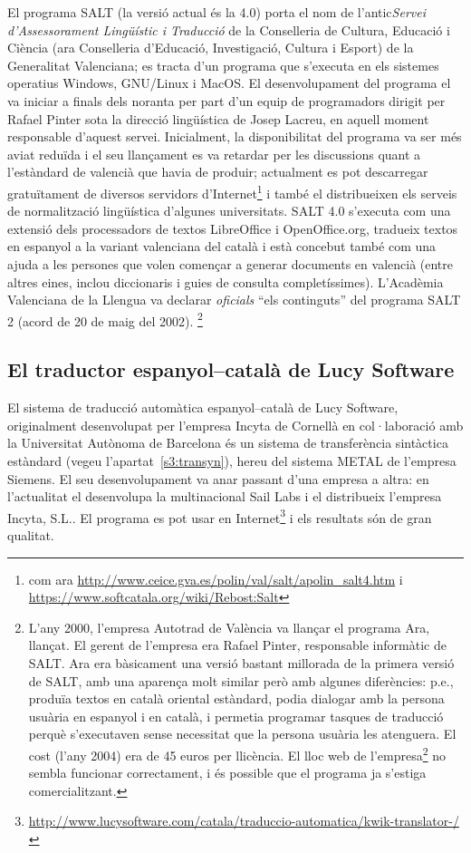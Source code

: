 El programa SALT (la versió actual és la 4.0) porta el nom de
l'antic\emph{Servei d'Assessorament Lingüístic i Traducció} de la
Conselleria de Cultura, Educació i Ciència (ara Conselleria
d'Educació, Investigació, Cultura i Esport) de la Generalitat
Valenciana; es tracta d'un programa que s'executa en els sistemes
operatius Windows, GNU/Linux i MacOS. El desenvolupament del programa
el va iniciar a finals dels noranta per part d'un equip de
programadors dirigit per Rafael Pinter sota la direcció lingüística de
Josep Lacreu, en aquell moment responsable d'aquest servei.
Inicialment, la disponibilitat del programa va ser més aviat reduïda i
el seu llançament es va retardar per les discussions quant a
l'estàndard de valencià que havia de produir; actualment es pot
descarregar gratuïtament de diversos servidors d'Internet\footnote{com
  ara \url{http://www.ceice.gva.es/polin/val/salt/apolin_salt4.htm} i
  \url{https://www.softcatala.org/wiki/Rebost:Salt}} i també el
distribueixen els serveis de normalització lingüística d'algunes
universitats.  SALT 4.0 s'executa com una extensió dels processadors
de textos LibreOffice i OpenOffice.org, tradueix textos en espanyol a
la variant valenciana del català i està concebut també com una ajuda a
les persones que volen començar a generar documents en valencià (entre
altres eines, inclou diccionaris i guies de consulta completíssimes).
L'Acadèmia Valenciana de la Llengua va declarar \emph{oficials} ``els
continguts'' del programa SALT 2 (acord de 20 de maig del
2002). \footnote{L'any 2000, l'empresa Autotrad de València va llançar
  el programa Ara, llançat. El gerent de l'empresa era Rafael Pinter,
  responsable informàtic de SALT. Ara era bàsicament una versió
  bastant millorada de la primera versió de SALT, amb una aparença
  molt similar però amb algunes diferències: p.e., produïa textos en
  català oriental estàndard, podia dialogar amb la persona usuària en
  espanyol i en català, i permetia programar tasques de traducció
  perquè s'executaven sense necessitat que la persona usuària les
  atenguera. El cost (l'any 2004) era de 45 euros per llicència. El
  lloc web de l'empresa\footnote{\url{http://www.ara-autotrad.es}} no
  sembla funcionar correctament, i és possible que el programa ja
  s'estiga comercialitzant.}

\subsection{El traductor espanyol--català de Lucy Software}

El sistema de traducció automàtica espanyol--català de Lucy Software,
originalment desenvolupat per l'empresa Incyta de Cornellà en
col·laboració amb la Universitat Autònoma de Barcelona és un sistema
de transferència sintàctica estàndard (vegeu
l'apartat~\ref{s3:transyn}), hereu del sistema METAL de l'empresa
Siemens. El seu desenvolupament va anar passant d'una empresa a altra:
en l'actualitat el desenvolupa la multinacional Sail Labs i el
distribueix l'empresa Incyta, S.L.. El programa es pot usar en
Internet\footnote{\url{http://www.lucysoftware.com/catala/traduccio-automatica/kwik-translator-/}}
i els resultats són de gran qualitat.

